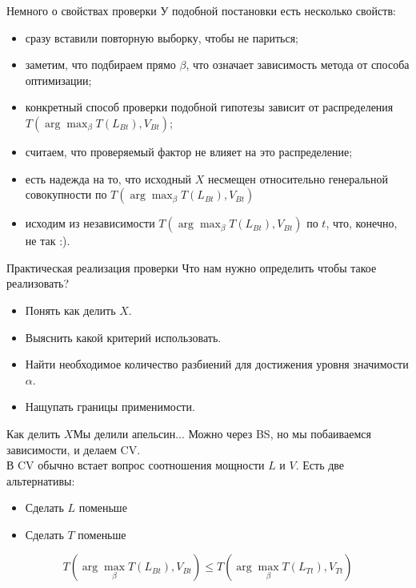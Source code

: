 \documentclass[14pt, fleqn, xcolor={dvipsnames, table}]{beamer}
\begin{document}
\begin{frame}{Немного о свойствах проверки}
\small
У подобной постановки есть несколько свойств:
\begin{itemize}
  \item сразу вставили повторную выборку, чтобы не париться;
  \item заметим, что подбираем прямо $\beta$, что означает зависимость метода от способа оптимизации;
  \item конкретный способ проверки подобной гипотезы зависит от распределения $T(\arg \max_{\beta} T(L_{Bt}), V_{Bt})$;
  \item считаем, что проверяемый фактор не влияет на это распределение;
  \item есть надежда на то, что исходный $X$ несмещен относительно генеральной совокупности по $T(\arg \max_{\beta} T(L_{Bt}), V_{Bt})$
  \item исходим из независимости $T(\arg \max_{\beta} T(L_{Bt}), V_{Bt})$ по $t$, что, конечно, не так :).
\end{itemize}
\end{frame}

\begin{frame}{Практическая реализация проверки}
Что нам нужно определить чтобы такое реализовать?
\begin{itemize}
  \item Понять как делить $X$.
  \item Выяснить какой критерий использовать.
  \item Найти необходимое количество разбиений для достижения уровня значимости $\alpha$.
  \item Нащупать границы применимости.
\end{itemize}
\end{frame}

\begin{frame}{Как делить $X$}{Мы делили апельсин...}
\small
Можно через BS, но мы побаиваемся зависимости, и делаем CV.\\
В CV обычно встает вопрос соотношения мощности $L$ и $V$. Есть две альтернативы:
\begin{itemize}
  \item Сделать $L$ поменьше \\
  \item \small Сделать $T$ поменьше \\
\end{itemize}
$$
T(\arg \max_{\beta} T(L_{Bt}), V_{Bt}) \le T(\arg \max_{\beta} T(L_{Tt}), V_{Tt})
$$
\end{frame}
\end{document}
